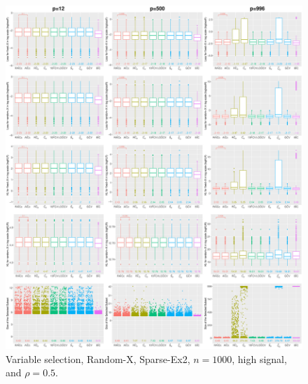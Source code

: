 \begin{figure}[!ht]
\centering
\includegraphics[width=\textwidth]{figures/supplement/randomx/subset_selection/Sparse-Ex2_n1000_hsnr_rho05.eps}
\caption{Variable selection, Random-X, Sparse-Ex2, $n=1000$, high signal, and $\rho=0.5$.}
\end{figure}
\clearpage
